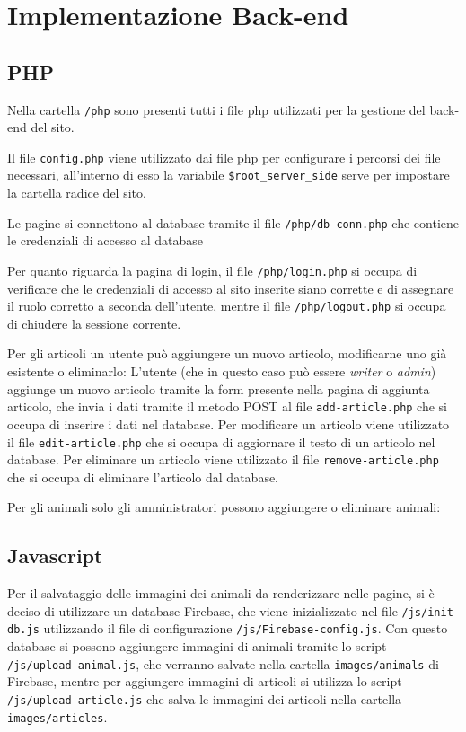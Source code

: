 \section{Implementazione Back-end}

\subsection{PHP}
Nella cartella \texttt{/php} sono presenti tutti i file php utilizzati per la gestione del back-end del sito.

Il file \texttt{config.php} viene utilizzato dai file php per configurare i percorsi dei file necessari, all'interno di esso la variabile \texttt{\$root\_server\_side}
serve per impostare la cartella radice del sito.

Le pagine si connettono al database tramite il file \texttt{/php/db-conn.php} che contiene le credenziali di accesso al database

Per quanto riguarda la pagina di login, il file \texttt{/php/login.php} si occupa di verificare che le credenziali di accesso al sito inserite siano corrette
e di assegnare il ruolo corretto a seconda dell'utente, mentre il file \texttt{/php/logout.php} si occupa di chiudere la sessione corrente.

Per gli articoli un utente può aggiungere un nuovo articolo, modificarne uno già esistente o eliminarlo:
L'utente (che in questo caso può essere \textit{writer} o \textit{admin}) aggiunge un nuovo articolo tramite la form presente nella pagina di aggiunta articolo, che invia i dati tramite il metodo POST al file \texttt{add-article.php} che si occupa di inserire i dati nel database.
Per modificare un articolo viene utilizzato il file \texttt{edit-article.php} che si occupa di aggiornare il testo di un articolo nel database.
Per eliminare un articolo viene utilizzato il file \texttt{remove-article.php} che si occupa di eliminare l'articolo dal database.

Per gli animali solo gli amministratori possono aggiungere o eliminare animali:

\subsection{Javascript}
Per il salvataggio delle immagini dei animali da renderizzare nelle pagine, si è deciso di utilizzare un database Firebase, che viene inizializzato nel file \texttt{/js/init-db.js} utilizzando il file di configurazione \texttt{/js/Firebase-config.js}. 
Con questo database si possono aggiungere immagini di animali tramite lo script \texttt{/js/upload-animal.js}, che verranno salvate nella cartella \texttt{images/animals} di Firebase, mentre per aggiungere immagini di articoli 
si utilizza lo script \texttt{/js/upload-article.js} che salva le immagini dei articoli nella cartella \texttt{images/articles}.

